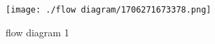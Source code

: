 \documentclass{article}
\begin{document}
\begin{minipage}[b]{0.3\linewidth}
    \begin{figure}
        \texttt{[image: ./flow diagram/1706271673378.png]}
    \caption{flow diagram 1}
    \label{fld:1}
    \end{figure}
\end{minipage}
\end{document}
